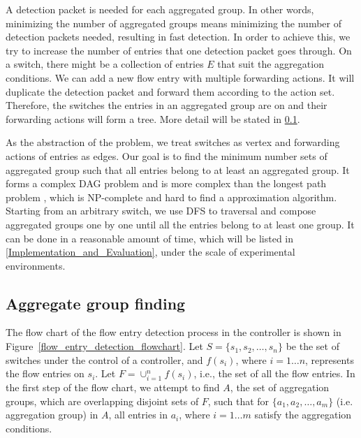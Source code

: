 A detection packet is needed for each aggregated group. In other words, minimizing the number of aggregated groups means minimizing the number of detection packets needed, resulting in fast detection. In order to achieve this, we try to increase the number of entries that one detection packet goes through. On a switch, there might be a collection of entries $E$ that suit the aggregation conditions. We can add a new flow entry with multiple forwarding actions. It will duplicate the detection packet and forward them according to the action set. Therefore, the switches the entries in an aggregated group are on and their forwarding actions will form a tree. More detail will be stated in \ref{Aggregated_group_finding}.

As the abstraction of the problem, we treat switches as vertex and forwarding actions of entries as edges. Our goal is to find the minimum number sets of aggregated group such that all entries belong to at least an aggregated group. It forms a complex DAG problem and is more complex than the longest path problem \cite{DMR97,RU04}, which is NP-complete and hard to find a approximation algorithm. Starting from an arbitrary switch, we use DFS to traversal and compose aggregated groups one by one until all the entries belong to at least one group. It can be done in a reasonable amount of time, which will be listed in \ref{Implementation_and_Evaluation}, under the scale of experimental environments.


\subsection{Aggregate group finding}
\label{Aggregated_group_finding}

The flow chart of the flow entry detection process in the controller is shown in Figure~\ref{flow_entry_detection_flowchart}. Let $S=\{s_1,s_2,\ldots,s_n\}$ be the set of switches under the control of a controller, and $f(s_i)$, where $i=1\ldots n$, represents the flow entries on $s_i$. Let $F=\cup_{i=1}^n f(s_i)$, i.e., the set of all the flow entries. In the first step of the flow chart, we attempt to find $A$, the set of aggregation groups, which are overlapping disjoint sets of $F$, such that for $\{a_1, a_2, \ldots, a_m\}$ (i.e. aggregation group) in $A$, all entries in $a_i$, where $i=1\ldots m$ satisfy the aggregation conditions.

